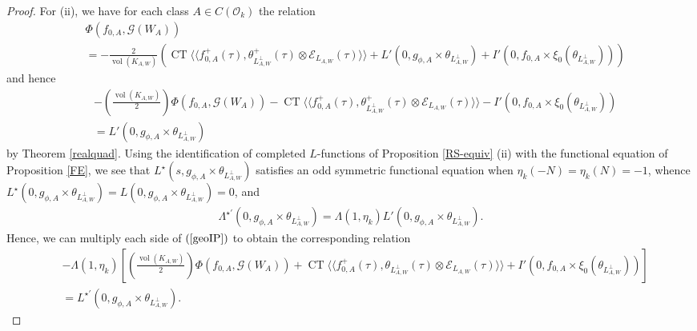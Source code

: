 \documentclass{amsart}
\theoremstyle{definition}
\theoremstyle{definition}
\theoremstyle{definition}
\begin{document}
\begin{proof}
For (ii), we have for each class $A \in C(\mathcal{O}_k)$ the relation
\begin{align*} &\Phi(f_{0, A}, \mathcal{G}(W_A)) \\ &= - \frac{2}{ \operatorname{vol}(K_{A,W})} \left(
\operatorname{CT} \langle \langle f_{0, A}^+(\tau), \theta_{L_{A, W}^{\perp}}^+(\tau) \otimes \mathcal{E}_{L_{A, W}}(\tau) \rangle \rangle
+ L'(0, g_{\phi, A} \times \theta_{L_{A, W}^{\perp}}) +I'(0, f_{0,A} \times \xi_0(\theta_{L_{A,W}^{\perp}})) \right) \end{align*}
and hence 
\begin{equation}\begin{aligned}\label{geoIP} &- \left( \frac{ \operatorname{vol}(K_{A,W})  }{ 2} \right) \Phi(f_{0, A}, \mathcal{G}(W_A)) 
- \operatorname{CT} \langle \langle f_{0, A}^+(\tau), \theta^+_{L_{A, W}^{\perp}}(\tau) \otimes \mathcal{E}_{L_{A, W}}(\tau) \rangle \rangle 
- I'(0, f_{0,A} \times \xi_0(\theta_{L_{A,W}^{\perp}})) \\
&= L'(0, g_{\phi, A} \times \theta_{L_{A, W}^{\perp}})  \end{aligned}\end{equation}
by Theorem \ref{realquad}. Using the identification of completed $L$-functions of Proposition \ref{RS-equiv} (ii)
with the functional equation of Proposition \ref{FE}, we see that $L^{\star}(s, g_{\phi, A} \times \theta_{L_{A, W}^{\perp}})$
satisfies an odd symmetric functional equation when $\eta_k(-N) = \eta_k(N) = -1$, whence
$L^{\star}(0, g_{\phi, A} \times \theta_{L_{A,W}^{\perp}}) = L(0, g_{\phi, A} \times \theta_{L_{A,W}^{\perp}}) = 0$, and 
\begin{align*} \Lambda^{\star \prime}(0, g_{\phi, A} \times \theta_{L_{A,W}^{\perp}}) 
= \Lambda(1, \eta_k) L'(0, g_{\phi, A} \times \theta_{L_{A,W}^{\perp}}). \end{align*}
Hence, we can multiply each side of $(\ref{geoIP})$ to obtain the corresponding relation
\begin{equation} \begin{aligned}\label{geoIP2} 
&- \Lambda(1, \eta_k) \left[ \left( \frac{ \operatorname{vol}(K_{A,W})  }{ 2 } \right) \Phi(f_{0, A}, \mathcal{G}(W_A)) 
+ \operatorname{CT} \langle \langle f_{0, A}^+(\tau), \theta_{L_{A, W}^{\perp}}(\tau) \otimes \mathcal{E}_{L_{A, W}}(\tau) \rangle \rangle 
+ I'(0, f_{0,A} \times \xi_0(\theta_{L_{A,W}^{\perp}})) \right] \\
&= L^{\star \prime}(0, g_{\phi, A} \times \theta_{L_{A, W}^{\perp}}). \end{aligned}\end{equation}

\end{proof}
\end{document}

